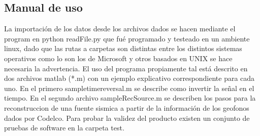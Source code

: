 \subsection{Manual de uso}
La importación de los datos desde los archivos dados se hacen mediante el
program en python readFile.py que fué programado y testeado en un ambiente
linux, dado que las rutas a carpetas son distintas entre los distintos sistemas
operativos como lo son los de Microsoft y otros basados en UNIX se hace
necesaria la advertencia.
El uso del programa propiamente tal está descrito en dos archivos matlab (*.m)
con un ejemplo explicativo correspondiente para cada uno. En el primero
sampletimereversal.m se describe como invertir la señal en el tiempo. En el 
segundo archivo sampleRecSource.m se describen los pasos para la reconstruccion 
de una fuente sismica a partir de la información de los geofonos dados por 
Codelco.
Para probar la validez del producto existen un conjunto de pruebas de software
en la carpeta test.






















